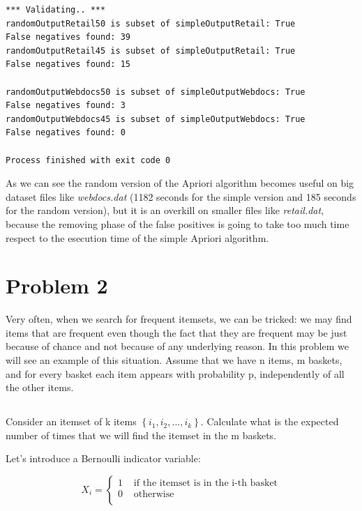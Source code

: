 \documentclass{article}
\begin{document}
\begin{lstlisting}
*** Validating.. ***
randomOutputRetail50 is subset of simpleOutputRetail: True
False negatives found: 39
randomOutputRetail45 is subset of simpleOutputRetail: True
False negatives found: 15

randomOutputWebdocs50 is subset of simpleOutputWebdocs: True
False negatives found: 3
randomOutputWebdocs45 is subset of simpleOutputWebdocs: True
False negatives found: 0

Process finished with exit code 0
\end{lstlisting} 

As we can see the random version of the Apriori algorithm becomes useful on big dataset files like \textit{webdocs.dat} (1182 seconds for the simple version and 185 seconds for the random version), but it is an overkill on smaller files like \textit{retail.dat}, because the removing phase of the false positives is going to take too much time respect to the esecution time of the simple Apriori algorithm.


\section{Problem 2}

Very often, when we search for frequent itemsets, we can be tricked: we may find items that are frequent even though the fact that they are frequent may be just because of chance and not because of any underlying reason. In this problem we will see an example of this situation.
Assume that we have n items, m baskets, and for every basket each item appears with probability p, independently of all the other items.

\subsection{}
Consider an itemset of k items $\left\{ i_{1}, i_{2}, . . . , i_{k} \right\}$. Calculate what is the expected number of times that we will find the itemset in the m baskets.

Let's introduce a Bernoulli indicator variable:

\begin{equation} \label{eq:bernoulli1}
X_{i} = \begin{cases}
	1 & \text{ if  the itemset is in the i-th basket} \\
	0 & \text{ otherwise } \\
\end{cases}
\end{equation}
\end{document}

